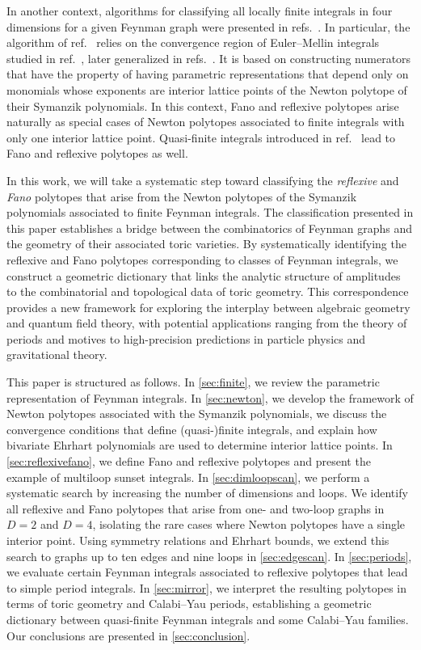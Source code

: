 \documentclass[12pt,a4paper]{article}
\theoremstyle{plain}
\theoremstyle{remark}
\begin{document}
	In another context, algorithms for classifying all locally finite integrals in four dimensions for a given Feynman graph 
    were presented in refs.~\cite{Gambuti:2023eqh,delaCruz:2024xsm}. In particular, the algorithm of ref.~\cite{delaCruz:2024xsm} relies on the convergence region of Euler--Mellin integrals studied in ref.~\cite{2010arXiv1010.5060N},  later generalized in refs.~\cite{2011arXiv1103.6273B, Schultka:2018nrs}. It is based on constructing numerators that have the property of having parametric representations that depend only on monomials whose exponents are  interior lattice points of the Newton polytope of their Symanzik polynomials.
    In this context, Fano and reflexive polytopes arise naturally as  special cases of Newton polytopes associated to finite integrals with only one interior lattice point.
    Quasi-finite integrals introduced in ref.~\cite{vonManteuffel:2014qoa}  lead to Fano and reflexive polytopes as well.

In this work, we will take a systematic step toward classifying the \emph{reflexive} and \emph{Fano} polytopes
that arise from the Newton polytopes of the Symanzik polynomials associated to finite Feynman integrals. The classification presented in this paper establishes a bridge between the combinatorics of Feynman graphs and the geometry of their associated toric varieties. By systematically identifying the reflexive and Fano polytopes corresponding to classes of Feynman integrals, we construct a geometric dictionary that links the analytic structure of amplitudes to the combinatorial and topological data of toric geometry. This correspondence provides a new framework for exploring the interplay between algebraic geometry and quantum field theory, with potential applications ranging from the theory of periods and motives to high-precision predictions in particle physics and gravitational theory.

\medskip
This paper is structured as follows.
In \cref{sec:finite}, we review the parametric representation of Feynman integrals.
In \cref{sec:newton}, we develop the framework of Newton polytopes associated with the Symanzik polynomials,
we discuss the convergence conditions that define (quasi-)finite integrals,
and explain how bivariate Ehrhart polynomials are used to determine interior lattice points.
In \cref{sec:reflexivefano}, we define Fano and reflexive polytopes and present the example of  multiloop sunset integrals.
In \cref{sec:dimloopscan}, we perform a systematic search by increasing the number of  dimensions and loops. We identify all reflexive and Fano polytopes that arise from one- and two-loop graphs in  $D=2$ and $D=4$,  isolating the rare cases where Newton polytopes have a single interior point. Using symmetry relations and Ehrhart bounds, we extend this search to graphs up to ten edges and nine loops in  
\cref{sec:edgescan}. In
\cref{sec:periods}, we evaluate certain Feynman integrals  associated to reflexive polytopes that lead to simple period integrals.
In \cref{sec:mirror}, 
we  interpret the resulting polytopes in terms of toric geometry and Calabi--Yau periods, establishing a geometric dictionary between quasi-finite Feynman integrals and some Calabi--Yau families. 
Our conclusions are presented in \cref{sec:conclusion}. 
\end{document}
